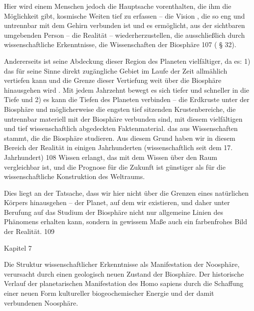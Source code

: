\documentclass[11pt,a4paper]{book}
\begin{document}
Hier wird einem Menschen jedoch die Hauptsache vorenthalten, die ihm die Möglichkeit gibt, kosmische Weiten tief zu erfassen -- die Vision , die so eng und untrennbar mit dem Gehirn verbunden ist und es ermöglicht, aus der sichtbaren umgebenden Person -- die Realität -- wiederherzustellen, die ausschließlich durch wissenschaftliche Erkenntnisse, die Wissenschaften der Biosphäre 107 ( § 32).



Andererseits ist seine Abdeckung dieser Region des Planeten vielfältiger, da es: 1) das für seine Sinne direkt zugängliche Gebiet im Laufe der Zeit allmählich vertiefen kann und die Grenze dieser Vertiefung weit über die Biosphäre hinausgehen wird . Mit jedem Jahrzehnt bewegt es sich tiefer und schneller in die Tiefe und 2) es kann die Tiefen des Planeten verbinden -- die Erdkruste unter der Biosphäre und möglicherweise die engsten tief sitzenden Krustenbereiche, die untrennbar materiell mit der Biosphäre verbunden sind, mit diesem vielfältigen und tief wissenschaftlich abgedeckten Faktenmaterial. das aus Wissenschaften stammt, die die Biosphäre studieren. Aus diesem Grund haben wir in diesem Bereich der Realität in einigen Jahrhunderten (wissenschaftlich seit dem 17. Jahrhundert) 108 Wissen erlangt, das mit dem Wissen über den Raum vergleichbar ist, und die Prognose für die Zukunft ist günstiger als für die wissenschaftliche Konstruktion des Weltraums.



Dies liegt an der Tatsache, dass wir hier nicht über die Grenzen eines natürlichen Körpers hinausgehen -- der Planet, auf dem wir existieren, und daher unter Berufung auf das Studium der Biosphäre nicht nur allgemeine Linien des Phänomens erhalten kann, sondern in gewissem Maße auch ein farbenfrohes Bild der Realität. 109



Kapitel 7



 



Die Struktur wissenschaftlicher Erkenntnisse als Manifestation der Noosphäre, verursacht durch einen geologisch neuen Zustand der Biosphäre. Der historische Verlauf der planetarischen Manifestation des Homo sapiens durch die Schaffung einer neuen Form kultureller biogeochemischer Energie und der damit verbundenen Noosphäre.



 
\end{document}
